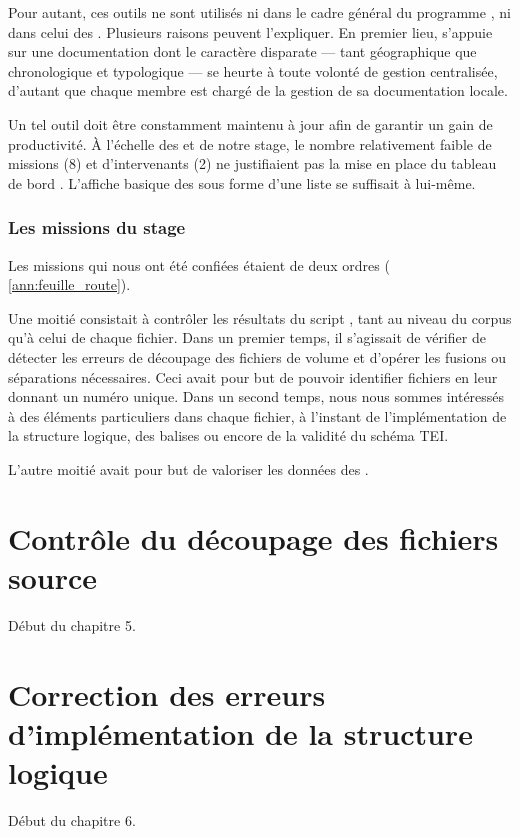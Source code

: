 Pour autant, ces outils ne sont utilisés ni dans le cadre général du programme \timeus, ni dans celui des \odm. Plusieurs raisons peuvent l'expliquer. En premier lieu, \timeus{} s'appuie sur une documentation dont le caractère disparate --- tant géographique que chronologique et typologique --- se heurte à toute volonté de gestion centralisée, d'autant que chaque membre est chargé de la gestion de sa documentation locale.

Un tel outil doit être constamment maintenu à jour afin de garantir un gain de productivité. À l'échelle des \odm{} et de notre stage, le nombre relativement faible de missions (8) et d'intervenants (2) ne justifiaient pas la mise en place du tableau de bord \gitlab. L'affiche basique des \issues{} sous forme d'une liste se suffisait à lui-même.

\subsection{Les missions du stage}

Les missions qui nous ont été confiées étaient de deux ordres (\ann{} \ref{ann:feuille_route}).

Une moitié consistait à contrôler les résultats du script \lse, tant au niveau du corpus qu'à celui de chaque fichier. Dans un premier temps, il s'agissait de vérifier de détecter les erreurs de découpage des fichiers de volume et d'opérer les fusions ou séparations nécessaires. Ceci avait pour but de pouvoir identifier fichiers en leur donnant un numéro unique. Dans un second temps, nous nous sommes intéressés à des éléments particuliers dans chaque fichier, à l'instant de l'implémentation de la structure logique, des balises  ou encore de la validité du schéma TEI.

L'autre moitié avait pour but de valoriser les données des \odm.

\chapter{Contrôle du découpage des fichiers source}

Début du chapitre 5.

\chapter[Correction des erreurs d'implémentation]{Correction des erreurs d'implémentation de la structure logique}

Début du chapitre 6.